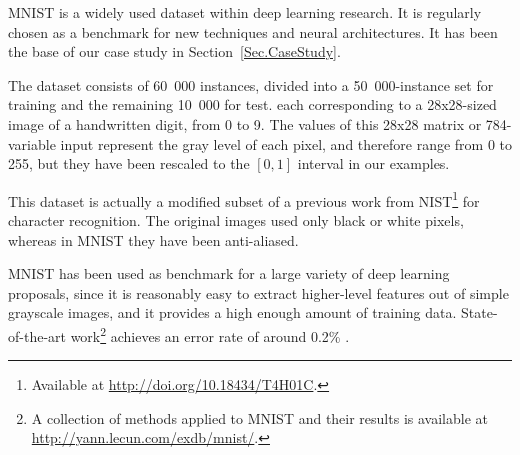 MNIST \cite{MNIST} is a widely used dataset within deep learning research. It is regularly chosen as a benchmark for new techniques and neural architectures. It has been the base of our case study in Section~\ref{Sec.CaseStudy}.

The dataset consists of 60~000 instances, divided into a 50~000-instance set for training and the remaining 10~000 for test. each corresponding to a 28x28-sized image of a handwritten digit, from 0 to 9. The values of this 28x28 matrix or 784-variable input represent the gray level of each pixel, and therefore range from 0 to 255, but they have been rescaled to the $[0,1]$ interval in our examples.

This dataset is actually a modified subset of a previous work from NIST\footnote{Available at \url{http://doi.org/10.18434/T4H01C}.} for character recognition. The original images used only black or white pixels, whereas in MNIST they have been anti-aliased.

MNIST has been used as benchmark for a large variety of deep learning proposals, since it is reasonably easy to extract higher-level features out of simple grayscale images, and it provides a high enough amount of training data. State-of-the-art work\footnote{A collection of methods applied to MNIST and their results is available at \url{http://yann.lecun.com/exdb/mnist/}.} achieves an error rate of around 0.2\% \cite{Alvear_Sandoval_2018,MulticolumnDNN}.

%

